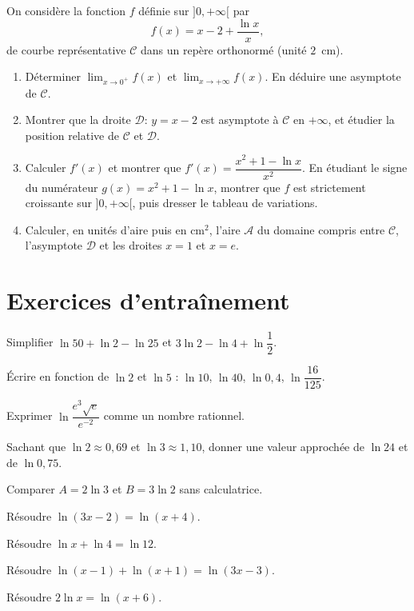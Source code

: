 \exo{} On considère la fonction $f$ définie sur $]0,+\infty[$ par
\[
f(x)=x-2+\frac{\ln x}{x},
\]
de courbe représentative $\mathcal C$ dans un repère orthonormé (unité $2$~cm).
\begin{enumerate}[label=\arabic*)]
\item Déterminer $\displaystyle\lim_{x\to0^{+}}f(x)$ et $\displaystyle\lim_{x\to+\infty}f(x)$.
En déduire une asymptote de $\mathcal C$.
\item Montrer que la droite $\mathcal D:\,y=x-2$ est asymptote à $\mathcal C$ en $+\infty$,
et étudier la position relative de $\mathcal C$ et $\mathcal D$.
\item Calculer $f'(x)$ et montrer que $f'(x)=\dfrac{x^{2}+1-\ln x}{x^{2}}$. En étudiant le
signe du numérateur $g(x)=x^{2}+1-\ln x$, montrer que $f$ est strictement croissante sur
$]0,+\infty[$, puis dresser le tableau de variations.
\item Calculer, en unités d'aire puis en cm$^2$, l'aire $\mathcal A$ du domaine compris
entre $\mathcal C$, l'asymptote $\mathcal D$ et les droites $x=1$ et $x=e$.
\end{enumerate}

\section{Exercices d'entraînement}

\exo{} Simplifier $\ln 50+\ln 2-\ln 25$ et $3\ln 2-\ln 4+\ln\dfrac12$.

\exo{} Écrire en fonction de $\ln 2$ et $\ln 5$ : $\ln 10$, $\ln 40$, $\ln 0{,}4$,
$\ln\dfrac{16}{125}$.

\exo{} Exprimer $\ln\dfrac{e^{3}\sqrt e}{e^{-2}}$ comme un nombre rationnel.

\exo{} Sachant que $\ln 2\approx0{,}69$ et $\ln 3\approx1{,}10$, donner une valeur
approchée de $\ln 24$ et de $\ln 0{,}75$.

\exo{} Comparer $A=2\ln 3$ et $B=3\ln 2$ sans calculatrice.

\exo{} Résoudre $\ln(3x-2)=\ln(x+4)$.

\exo{} Résoudre $\ln x+\ln 4=\ln 12$.

\exo{} Résoudre $\ln(x-1)+\ln(x+1)=\ln(3x-3)$.

\exo{} Résoudre $2\ln x=\ln(x+6)$.

